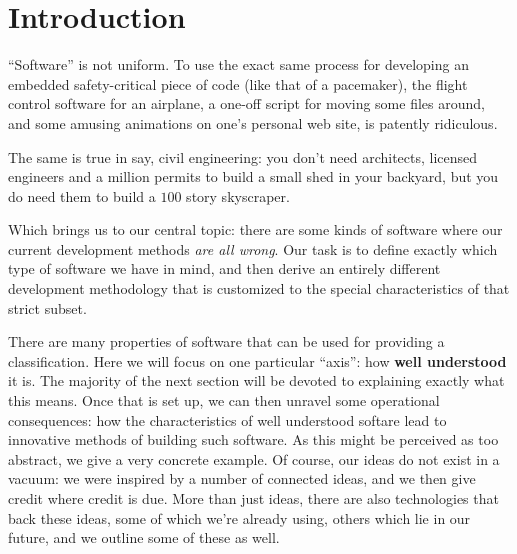 \documentclass[sigconf,review]{acmart}
\begin{document}

\newtheorem{defn}{Definition}

\maketitle

\section{Introduction} \label{ch:introduction}

``Software'' is not uniform. To use the exact same process for
developing an embedded safety-critical piece of code (like that of
a pacemaker), the flight control software for an airplane, a one-off
script for moving some files around, and some amusing animations on
one's personal web site, is patently ridiculous.

The same is true in say, civil engineering: you don't need architects,
licensed engineers and a million permits to build a small shed in your
backyard, but you do need them to build a $100$ story skyscraper.

Which brings us to our central topic: there are some kinds of software
where our current development methods \emph{are all wrong}. Our task
is to define exactly which type of software we have in mind, and then
derive an entirely different development methodology that is
customized to the special characteristics of that strict subset.

There are many properties of software that can be used for providing
a classification. Here we will focus on one particular ``axis'': how
\textbf{well understood} it is. The majority of the next section will
be devoted to explaining exactly what this means. Once that is set up,
we can then unravel some operational consequences: how the characteristics of
well understood softare lead to innovative methods of building such
software. As this might be perceived as too abstract, we give a very
concrete example. Of course, our ideas do not exist in a vacuum: we were
inspired by a number of connected ideas, and we then give credit where
credit is due. More than just ideas, there are also technologies that back
these ideas, some of which we're already using, others which lie in our
future, and we outline some of these as well. %
\end{document}
